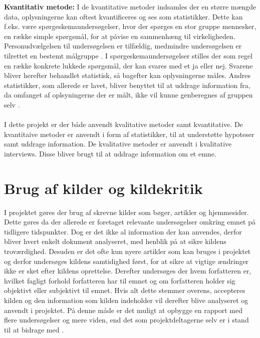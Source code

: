 
\noindent\textbf{Kvantitativ metode:}
I de kvantitative metoder indsamles der en større mængde data, oplysningerne kan oftest kvantificeres og ses som statistikker. Dette kan f.eks. være spørgeskemaundersøgelser, hvor der spørges en stor gruppe mennesker, en række simple spørgsmål, for at påvise en sammenhæng til virkeligheden. Personudvælgelsen til undersøgelsen er tilfældig, medmindre undersøgelsen er tilrettet en bestemt målgruppe \citep{Kvan}. I spørgeskemaundersøgelser stilles der som regel en række konkrete lukkede spørgsmål, der kan svares med et ja eller nej. Svarene bliver herefter behandlet statistisk, så bagefter kan oplysningerne måles. Andres statistikker, som allerede er lavet, bliver benyttet til at uddrage information fra, da omfanget af oplsyningerne der er målt, ikke vil kunne genberegnes af gruppen selv \citep{Gymportalen}.\\\\

\noindent I dette projekt er der både anvendt kvalitative metoder samt kvantitative. De kvantitaive metoder er anvendt i form af statistikker, til at understøtte hypoteser samt uddrage information. De kvalitative metoder er anvendt i kvalitative interviews. Disse bliver brugt til at uddrage information om et emne.

\section{Brug af kilder og kildekritik}
I projektet gøres der brug af skrevne kilder som bøger, artikler og hjemmesider. Dette gøres da der allerede er foretaget relevante undersøgelser omkring emnet på tidligere tidspunkter. Dog er det ikke al information der kan anvendes, derfor bliver hvert enkelt dokument analyseret, med henblik på at sikre kildens troværdighed. Desuden er det ofte kun nyere artikler som kan bruges i projektet og derfor undersøges kildens samtidighed først, for at sikre at vigtige ændringer ikke er sket efter kildens oprettelse. Derefter undersøges der hvem forfatteren er, hvilket fagligt forhold forfatteren har til emnet og om forfatteren holder sig objektivt eller subjektivt til emnet. Hvis alt dette stemmer overens, accepteres kilden og den information som kilden indeholder vil derefter blive analyseret og anvendt i projektet. På denne måde er det muligt at opbygge en rapport med flere undersøgelser og mere viden, end det som projektdeltagerne selv er i stand til at bidrage med \citep{Kildekritik}.

